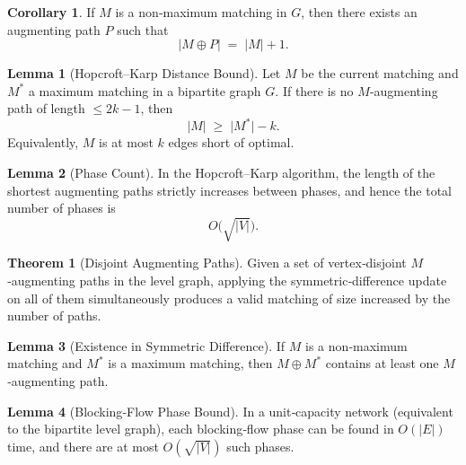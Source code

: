 \documentclass{article}
\theoremstyle{definition}
\newtheorem{theorem}{Theorem}
\newtheorem{lemma}{Lemma}
\newtheorem{corollary}{Corollary}
\begin{document}
\begin{corollary}
If $M$ is a non‐maximum matching in $G$, then there exists an augmenting path $P$ such that
\[
|M \oplus P| \;=\; |M| + 1.
\]
\end{corollary}

\begin{lemma}[Hopcroft–Karp Distance Bound]
\label{lem:hk-distance}
Let $M$ be the current matching and $M^*$ a maximum matching in a bipartite graph $G$.  If there is no $M$‐augmenting path of length $\le 2k-1$, then
\[
|M| \;\ge\;\bigl|M^*\bigr| - k.
\]
Equivalently, $M$ is at most $k$ edges short of optimal.
\end{lemma}

\begin{lemma}[Phase Count]
\label{lem:hk-phases}
In the Hopcroft–Karp algorithm, the length of the shortest augmenting paths strictly increases between phases, and hence the total number of phases is
\[
O\bigl(\sqrt{|V|}\bigr).
\]
\end{lemma}

\begin{theorem}[Disjoint Augmenting Paths]
Given a set of vertex‐disjoint $M$‐augmenting paths in the level graph, applying the symmetric‐difference update on all of them simultaneously produces a valid matching of size increased by the number of paths.
\end{theorem}

\begin{lemma}[Existence in Symmetric Difference]
If $M$ is a non‐maximum matching and $M^*$ is a maximum matching, then $M \oplus M^*$ contains at least one $M$‐augmenting path.
\end{lemma}


\begin{lemma}[Blocking‐Flow Phase Bound]
In a unit‐capacity network (equivalent to the bipartite level graph), each blocking‐flow phase can be found in $O(|E|)$ time, and there are at most $O(\sqrt{|V|})$ such phases.
\end{lemma}
\end{document}
